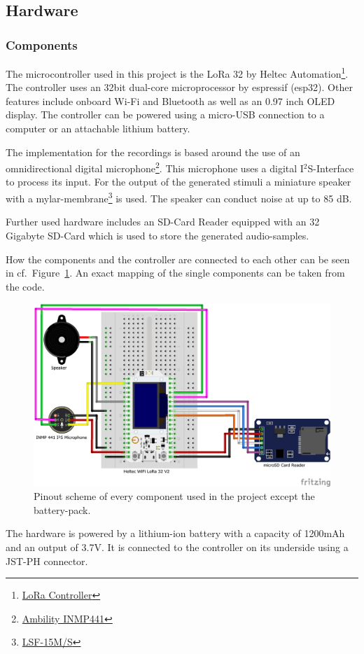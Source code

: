 \subsection{Hardware}
\subsubsection{Components}
The microcontroller used in this project is the LoRa 32 by Heltec Automation\footnote{\href{https://heltec.org/project/wifi-kit-32/}{LoRa Controller}}.
The controller uses an 32bit dual-core microprocessor by espressif (esp32).
Other features include onboard Wi-Fi and Bluetooth as well as an 0.97 inch OLED display.
The controller can be powered using a micro-USB connection to a computer or an attachable lithium battery.

The implementation for the recordings is based around the use of an omnidirectional digital microphone\footnote{\href{https://www.amazon.de/Ambility-Omnidirektionales-Mikrofonmodul-I2S-Schnittstelle-Precision/dp/B07MW95PSS}{Ambility INMP441}}.
This microphone uses a digital I$^{2}$S-Interface to process its input. 
For the output of the generated stimuli a miniature speaker with a mylar-membrane\footnote{\href{https://www.conrad.de/de/p/lsf-15m-s-8-ohm-0-8w-miniatur-lautsprecher-geraeusch-entwicklung-85-db-0-500-w-1-st-710277.html}{LSF-15M/S}} is used.
The speaker can conduct noise at up to 85 dB.

Further used hardware includes an SD-Card Reader equipped with an 32 Gigabyte SD-Card which is used to store the generated audio-samples.

How the components and the controller are connected to each other can be seen in cf.~Figure~\ref*{fig:pinout}.
An exact mapping of the single components can be taken from the code.
\begin{figure}[H]
	\includegraphics[width=\linewidth]{Media/Hardware_Pinout.png}
	\caption{Pinout scheme of every component used in the project except the battery-pack.}
	\label{fig:pinout}
\end{figure}
The hardware is powered by a lithium-ion battery with a capacity of 1200mAh and an output of 3.7V.
It is connected to the controller on its underside using a JST-PH connector. 

